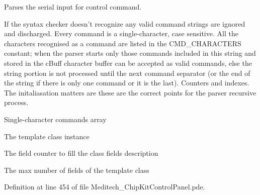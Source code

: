 \begin{DoxyCode}
\begin{DoxyCode}
\begin{DoxyCode}
Parses the serial input for control command. 

If the syntax checker doesn't recognize any valid command strings are ignored and discharged. Every command is a single-\/character, case sensitive. All the characters recognised as a command are listed in the C\-M\-D\-\_\-\-C\-H\-A\-R\-A\-C\-T\-E\-R\-S constant; when the parser starts only those commands included in this string and stored in the c\-Buff character buffer can be accepted as valid commands, else the string portion is not processed until the next command separator (or the end of the string if there is only one command or it is the last). Counters and indexes. The initaliasation matters are these are the correct points for the parser recursive process.

Single-\/character commands array

The template class instance

The field counter to fill the class fields description

The max number of fields of the template class 

Definition at line 454 of file Meditech\-\_\-\-Chip\-Kit\-Control\-Panel.\-pde.




\end{DoxyCode}
\end{DoxyCode}
\end{DoxyCode}
